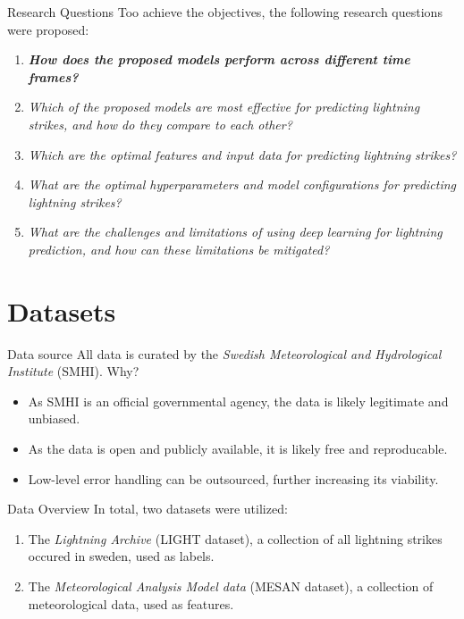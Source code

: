 \documentclass[10pt]{beamer}
\begin{document}
\begin{frame}{Research Questions}
Too achieve the objectives, the following research questions were proposed:
\begin{enumerate}
	\item \textit{\textbf{How does the proposed models perform across different time frames?}}
	\item \textit{Which of the proposed models are most effective for predicting lightning strikes, and how do they compare to each other?}
	\item \textit{Which are the optimal features and input data for predicting lightning strikes?}
	\item \textit{What are the optimal hyperparameters and model configurations for predicting lightning strikes?}
	\item \textit{What are the challenges and limitations of using deep learning for lightning prediction, and how can these limitations be mitigated?}
\end{enumerate}
\end{frame}


\section{Datasets}


\begin{frame}{Data source}
All data is curated by the \textit{Swedish Meteorological and Hydrological Institute} (SMHI).\newline
Why?
\begin{itemize}
	\item As SMHI is an official governmental agency, the data is likely legitimate and unbiased.
	\item As the data is open and publicly available, it is likely free and reproducable.
	\item Low-level error handling can be outsourced, further increasing its viability.
\end{itemize}
\end{frame}


\begin{frame}{Data Overview}
In total, two datasets were utilized:
\begin{enumerate}
	\item The \textit{Lightning Archive} (LIGHT dataset), a collection of all lightning strikes occured in sweden, used as labels.
	\item The \textit{Meteorological Analysis Model data} (MESAN dataset), a collection of meteorological data, used as features.
\end{enumerate}
\end{frame}
\end{document}
